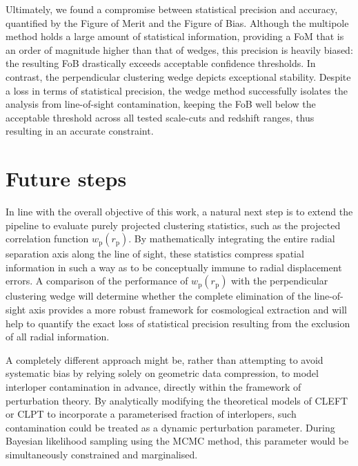 \documentclass[12pt,a4paper,oneside]{report}
\begin{document}
Ultimately, we found a compromise between statistical precision and accuracy, quantified by the Figure of Merit and the Figure of Bias. Although the multipole method holds a large amount of statistical information, providing a FoM that is an order of magnitude higher than that of wedges, this precision is heavily biased: the resulting FoB drastically exceeds acceptable confidence thresholds. In contrast, the perpendicular clustering wedge depicts exceptional stability. Despite a loss in terms of statistical precision, the wedge method successfully isolates the analysis from line-of-sight contamination, keeping the FoB well below the acceptable threshold across all tested scale-cuts and redshift ranges, thus resulting in an accurate constraint.

\section{Future steps}\label{sec:FutureSteps}
In line with the overall objective of this work, a natural next step is to extend the pipeline to evaluate purely projected clustering statistics, such as the projected correlation function $w_\mathrm{p}(r_\mathrm{p})$. By mathematically integrating the entire radial separation axis along the line of sight, these statistics compress spatial information in such a way as to be conceptually immune to radial displacement errors. A comparison of the performance of $w_\mathrm{p}(r_\mathrm{p})$ with the perpendicular clustering wedge will determine whether the complete elimination of the line-of-sight axis provides a more robust framework for cosmological extraction and will help to quantify the exact loss of statistical precision resulting from the exclusion of all radial information.

A completely different approach might be, rather than attempting to avoid systematic bias by relying solely on geometric data compression, to model interloper contamination in advance, directly within the framework of perturbation theory. By analytically modifying the theoretical models of CLEFT or CLPT to incorporate a parameterised fraction of interlopers, such contamination could be treated as a dynamic perturbation parameter. During Bayesian likelihood sampling using the MCMC method, this parameter would be simultaneously constrained and marginalised.



\end{document}
